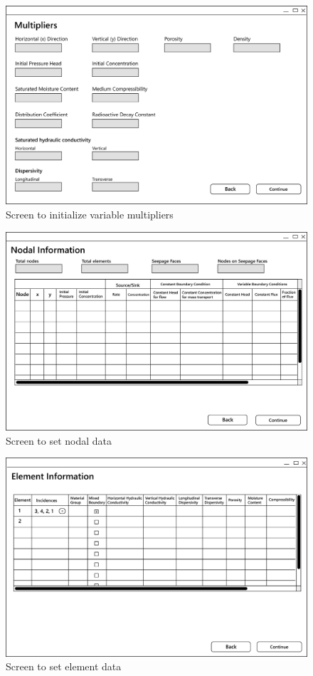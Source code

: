 \documentclass[onecolumn, draftclsnofoot,10pt, compsoc]{IEEEtran}
\begin{document}
\begin{figure}[H]
\centering
\includegraphics[scale=0.5]{GS2_multipliers.png}
\caption{Screen to initialize variable multipliers}
\label{fig:Multiplier Screen}
\end{figure}

\begin{figure}[H]
\centering
\includegraphics[scale=0.5]{GS2_nodal.png}
\caption{Screen to set nodal data}
\label{fig:Nodal Information Screen}
\end{figure}

\begin{figure}[H]
\centering
\includegraphics[scale=0.5]{GS2_element.png}
\caption{Screen to set element data}
\label{fig:Element Information Screen}
\end{figure}
\end{document}
